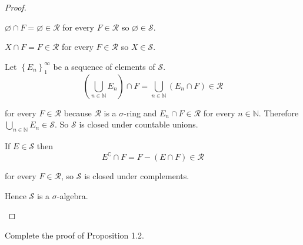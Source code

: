 \begin{proof}
\begin{enumerate}[itemsep=0pt,label=\textbf{\alph*.}]
              \( \varnothing \cap F = \varnothing \in \mathcal{R} \) for every \( F \in \mathcal{R} \) so \( \varnothing \in \mathcal{S} \).

              \( X \cap F = F \in \mathcal{R} \) for every \( F \in \mathcal{R} \) so \( X \in \mathcal{S} \).

              Let \( {\left\{ E_{n} \right\}}_{1}^{\infty} \) be a sequence of elements of \( \mathcal{S} \).
              \[
                  \left(\bigcup_{n\in\mathbb{N}} E_{n}\right) \cap F = \bigcup_{n\in\mathbb{N}} (E_{n} \cap F) \in \mathcal{R}
              \]

              for every \( F \in \mathcal{R} \) because \( \mathcal{R} \) is a \( \sigma \)-ring and \( E_{n} \cap F \in \mathcal{R} \) for every \( n \in \mathbb{N} \). Therefore \( \bigcup_{n\in\mathbb{N}} E_{n} \in \mathcal{S} \). So \( \mathcal{S} \) is closed under countable unions.

              If \( E \in \mathcal{S} \) then
              \[
                  E^{\complement} \cap F = F - (E \cap F) \in \mathcal{R}
              \]

              for every \( F \in \mathcal{R} \), so \( \mathcal{S} \) is closed under complements.

              Hence \( \mathcal{S} \) is a \( \sigma \)-algebra.
    \end{enumerate}
\end{proof}

\newpage

\begin{exercise}
    Complete the proof of Proposition 1.2.
\end{exercise}


